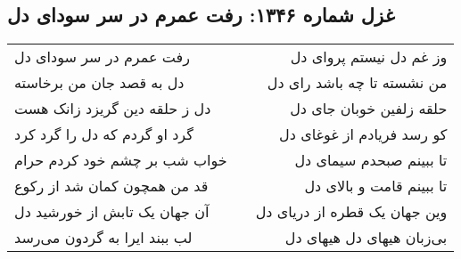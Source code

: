 \begin{center}
\section*{غزل شماره ۱۳۴۶: رفت عمرم در سر سودای دل}
\label{sec:1346}
\begin{longtable}{l p{0.5cm} r}
رفت عمرم در سر سودای دل
&&
وز غم دل نیستم پروای دل
\\
دل به قصد جان من برخاسته
&&
من نشسته تا چه باشد رای دل
\\
دل ز حلقه دین گریزد زانک هست
&&
حلقه زلفین خوبان جای دل
\\
گرد او گردم که دل را گرد کرد
&&
کو رسد فریادم از غوغای دل
\\
خواب شب بر چشم خود کردم حرام
&&
تا ببینم صبحدم سیمای دل
\\
قد من همچون کمان شد از رکوع
&&
تا ببینم قامت و بالای دل
\\
آن جهان یک تابش از خورشید دل
&&
وین جهان یک قطره از دریای دل
\\
لب ببند ایرا به گردون می‌رسد
&&
بی‌زبان هیهای دل هیهای دل
\\
\end{longtable}
\end{center}
